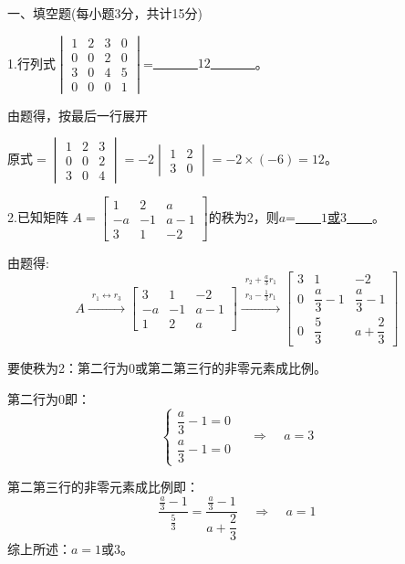 \documentclass{article}
\begin{document}
一、填空题(每小题3分，共计15分)

1.行列式$
\begin{vmatrix}
  1 & 2 & 3 & 0\\
  0 & 0 & 2 & 0\\
  3 & 0 & 4 & 5\\
  0 & 0 & 0 &1
\end{vmatrix}
$=\underline{~~~~~~~\textcolor[rgb]{1.00,0.00,0.00}{$12$}~~~~~~~}。

\begin{jie}
由题得，按最后一行展开

原式$=
\begin{vmatrix}
  1 & 2 & 3 \\
  0 & 0 & 2 \\
  3 & 0 & 4
\end{vmatrix}
=-2
\begin{vmatrix}
  1 & 2  \\
  3 & 0
\end{vmatrix}
=-2\times(-6)=12$。
\end{jie}

2.已知矩阵
$
A=\begin{bmatrix}
    1 & 2 &a\\
    -a & -1 &a-1\\
    3& 1 & -2
  \end{bmatrix}
$的秩为2，则$a$=\underline{~~~~\textcolor[rgb]{1.00,0.00,0.00}{$1$或$3$}~~~~}。

\begin{jie}
由题得:
\begin{equation*}
A\xrightarrow{\substack{ r_1 \leftrightarrow r_3 }}
{
\begin{bmatrix}
 3& 1 & -2\\
    -a & -1 &a-1\\
    1 & 2 &a
  \end{bmatrix}
}\xrightarrow{\substack{ r_2+\frac{a}{3}r_1 \\ r_3 - \frac{1}{3}r_1 }}
{
\begin{bmatrix}
 3& 1 & -2\\%
    0 & \dfrac{a}{3}-1 &\dfrac{a}{3}-1\\
    0 & \dfrac{5}{3} &a+\dfrac{2}{3}
  \end{bmatrix}
}
\end{equation*}

要使秩为2：第二行为0或第二第三行的非零元素成比例。

第二行为0即：
\begin{equation*}
  \begin{cases}
\dfrac{a}{3}-1=0\\
\dfrac{a}{3}-1=0
  \end{cases}~~~~~\Rightarrow~~~~~
  a=3
\end{equation*}

第二第三行的非零元素成比例即：
\begin{equation*}
\dfrac{\frac{a}{3}-1}{\frac{5}{3}}=\dfrac{\frac{a}{3}-1}{a+\dfrac{2}{3}}~~~~~\Rightarrow~~~~~a=1
\end{equation*}
综上所述：$a=1$或$3$。
\end{jie}
\end{document}
